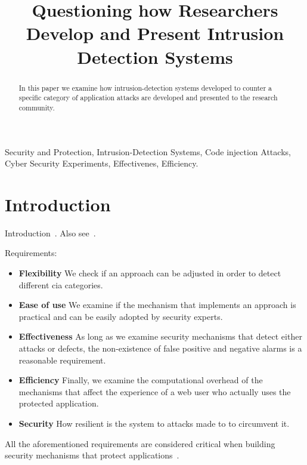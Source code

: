\documentclass[conference]{IEEEtran}
\date{}
\begin{document}
\author{
}

\title{Questioning how Researchers Develop and Present Intrusion Detection Systems}

\maketitle
\begin{abstract}
In this paper we examine how intrusion-detection
systems developed to counter a specific category
of application attacks are developed and presented to
the research community.
\end{abstract}

\begin{IEEEkeywords}
Security and Protection, Intrusion-Detection Systems, Code injection Attacks, Cyber Security Experiments, Effectivenes, Efficiency.
\end{IEEEkeywords}

\IEEEpeerreviewmaketitle

\section{Introduction}

Introduction~\cite{I05}. Also see~\cite{A00}.

Requirements:
\begin{itemize}
	\item {\bf Flexibility} We check if an approach
can be adjusted in order to detect different {\sc cia} categories.
	\item {\bf Ease of use} We examine if the mechanism that
implements an approach is practical and can be easily adopted
by security experts.
	\item {\bf Effectiveness} As long as we examine security
mechanisms that detect either attacks or defects,
the non-existence of false positive and negative alarms
is a reasonable requirement.
	\item {\bf Efficiency} Finally, we examine
the computational overhead of the mechanisms that affect the experience of
a web user who actually uses the protected application.
	\item {\bf Security} How resilient is the system to
attacks made to to circumvent it.
\end{itemize}
All the aforementioned requirements are considered critical
when building security mechanisms that protect
applications~\cite{A01,A00}.
\end{document}
